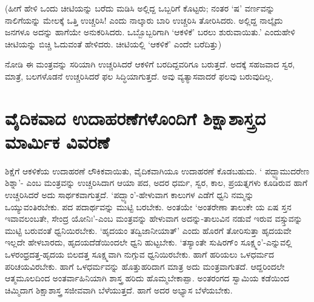 (ಹೀಗೆ ಹೇಳಿ ಒಂದು ಚೀಟಿಯನ್ನು ಬರೆದು ಮಡಿಸಿ ಅಲ್ಲಿದ್ದ ಒಬ್ಬರಿಗೆ ಕೊಟ್ಟರು; ನಂತರ `ಷ' ವರ್ಣವನ್ನು ನಾಲಿಗೆಯನ್ನು ಮೇಲಕ್ಕೆ  ಒತ್ತಿ ಉಚ್ಚರಿಸಿ! ಎಂದು ನಾಲ್ಕಾರು ಬಾರಿ ಉಚ್ಚರಿಸಿ ತೋರಿಸಿದರು. ಅಲ್ಲಿದ್ದ ನಾಲ್ಕೈದು ಜನಗಳೂ ಅದನ್ನು ಹಾಗೆಯೇ ಅನುಕರಿಸಿದರು. ಒಬ್ಬೊಬ್ಬರಿಗಾಗಿ `ಆಕಳಿಕೆ' ಬರಲು ಶುರುವಾಯಿತು.' ಎಂದುಹೇಳಿ ಚೀಟಿಯನ್ನು ಬಿಚ್ಚಿ ಓದುವಂತೆ ಹೇಳಿದರು. ಚೀಟಿಯಲ್ಲಿ `ಆಕಳಿಕೆ' ಎಂದೇ ಬರೆದಿತ್ತು)

ನೋಡಿ ಈ ಮಂತ್ರವನ್ನು ಸರಿಯಾಗಿ ಉಚ್ಚರಿಸಿದರೆ ಆಕಳಿಗೆ ಬರದಿದ್ದವರಿಗೂ ಬರುತ್ತದೆ. ಅದಕ್ಕೆ ಸಹಜವಾದ ಸ್ವರ, ಮಾತ್ರೆ, ಬಲಗಳೊಡನೆ ಉಚ್ಚರಿಸಿದರೆ ಫಲ ಸಿದ್ಧಿಯಾಗುತ್ತದೆ. ಅವು ವ್ಯತ್ಯಾಸವಾದರೆ ಫಲವು ಬರುವುದಿಲ್ಲ.

\section*{ವೈದಿಕವಾದ ಉದಾಹರಣೆಗಳೊಂದಿಗೆ ಶಿಕ್ಷಾಶಾಸ್ತ್ರದ ಮಾರ್ಮಿಕ ವಿವರಣೆ}

ಶಿಕ್ಷೆಗೆ ಆಕಳಿಕೆಯ ಉದಾಹರಣೆ ಲೌಕಿಕವಾಯಿತು, ವೈದಿಕವಾಗಿಯೂ ಉದಾಹರಣೆ ಕೊಡಬಹುದು. ` ಪದ್ಭ್ಯಾಮುದರೇಣ ಶಿಶ್ನಾ'- ಎಂಬ ಮಂತ್ರವನ್ನು ಉಚ್ಚರಿಸಿದಾಗ ಆಯಾ ಪದ, ಅದರ ಧರ್ಮ, ಸ್ವರ, ಕಾಲ, ಪ್ರಯತ್ನಗಳು ಕೂಡಿರುವ ಹಾಗೆ ಉಚ್ಚರಿಸಿದರೆ ಅದು ಸಾರ್ಥಕವಾಗುತ್ತದೆ. `ಪದ್ಭ್ಯಾಂ'-ಹೇಳುವಾಗ ಕಾಲುಗಳ ಎಡೆಗೆ ಧ್ವನಿ ನಮ್ಮನ್ನು ಒಯ್ಯುವಂತಿರಬೇಕು. ಪದ ಪದಾರ್ಥವನ್ನು ಮುಟ್ಟಿ ಬರಬೇಕು. ಅಂತಯೇ `ಅಂತರೇಣಾ ತಾಲುಕೇ ಯ ಏಷ ಸ್ತನ ಇವಾವಲಂಬತೇ, ಸೇಂದ್ರ ಯೋನಿಃ'-ಎಂಬ ಮಂತ್ರವನ್ನು ಹೇಳುವಾಗ ಅದನ್ನು-ತಾಲುವಿನ ನಡುವೆ ಇರುವ ವಸ್ಸ್ತುವನ್ನು ಮುಟ್ಟಿ ಬರುವಂತೆ ಧ್ವನಿಯಿರಬೇಕು. `ಹೃದಯಂ ತದ್ವಿಜಾನೀಯಾತ್' ಎಂದು ಹೊರಗೆ ತೋರಿಸುತ್ತಾ ಹೃದಯವೇ ಇಲ್ಲದೇ ಹೇಳಬಾರದು, ಹೃದಯದೆಡೆಯಿಂದಲೇ ಧ್ವನಿ ಹುಟ್ಟಬೇಕು. `ತಸ್ಯಾಂತೇ ಸುಷಿರಗ್ಂ ಸೂಕ್ಷ್ಮಂ'-ಎನ್ನುವಲ್ಲಿ ಒಳರಂಧ್ರದತ್ತ-ಹೃದಯ ಬಿಲದತ್ತ ಸೂಕ್ಷ್ಮವಾಗಿ ನುಗ್ಗುವ ಧ್ವನಿಯಿರಬೇಕು. ಹಾಗೆ ಹರಿಯಲು ಒಳಧರ್ಮದ ಪರಿಚಯವಿರಬೇಕು. ಹಾಗೆ ಒಳಧರ್ಮವನ್ನು ಹೊತ್ತುಹರಿದಾಗ ಮಾತ್ರ ಅದು ಮಂತ್ರವಾಗುತದೆ. ಆದ್ದರಿಂದಲೇ ಆತ್ಮಮೂಲದಿಂದ ಅಂತರ್ವಾಹಿನಿಯಾಗಿ ಶಾಸ್ತ್ರ ಹರಿದು ಹೊಮ್ಮಬೇಕಾಪ್ಪಾ. ಅಂತರಂಗದ ಸ್ವಾಮಿಯ ಕಡೆಯಿಂದ ಚಿಮ್ಮಿದಾಗ ಶಿಕ್ಷಾಶಾಸ್ತ್ರ ಸಜೀವವಾಗಿ ಬೆಳೆಯುತ್ತದೆ. ಹಾಗೆ ಅದರ ಅಭ್ಯಾಸ ಬೆಳೆಯಬೇಕು.



